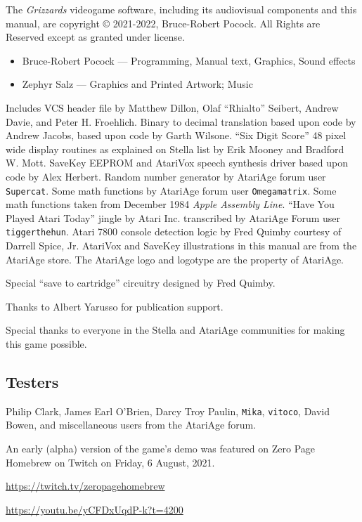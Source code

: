 \documentclass[10pt,twocolumn,openany,article]{memoir}
\begin{document}
{\small

  The \textit{Grizzards}  videogame software, including  its audiovisual
  components  and this  manual,  are  copyright \copyright{}  2021-2022,
  Bruce-Robert  Pocock.  All  Rights  are  Reserved  except  as  granted
  under license.

\begin{itemize}
\item Bruce-Robert Pocock --- Programming, Manual text, Graphics,
  Sound effects
\item Zephyr Salz --- Graphics and Printed Artwork; Music
\end{itemize}

\bigskip

Includes VCS  header file by  Matthew Dillon, Olaf  ``Rhialto'' Seibert,
Andrew  Davie, and  Peter H.  Froehlich. Binary  to decimal  translation
based upon  code by  Andrew Jacobs,  based upon  code by  Garth Wilsone.
``Six  Digit Score''  48 pixel  wide  display routines  as explained  on
Stella list  by Erik  Mooney and  Bradford W.  Mott. SaveKey  EEPROM and
AtariVox  speech  synthesis driver  based  upon  code by  Alex  Herbert.
Random  number  generator  by  AtariAge  forum  user  \texttt{Supercat}.
Some  math  functions  by AtariAge  forum  user  \texttt{Omega\-matrix}.
Some  math functions  taken  from December  1984 \textit{Apple  Assembly
  Line}.  ``Have  You   Played  Atari  Today''  jingle   by  Atari  Inc.
transcribed by AtariAge Forum user \texttt{tigger\-the\-hun}. Atari 7800
console detection  logic by Fred  Quimby courtesy of Darrell  Spice, Jr.
AtariVox and SaveKey illustrations in  this manual are from the AtariAge
store.  \ifdefined\DEMO\else  The AtariAge  logo  and  logotype are  the
property of AtariAge. \fi

Special ``save to cartridge'' circuitry designed by Fred Quimby.

Thanks to Albert Yarusso for publication support.

Special thanks  to everyone in  the Stella and AtariAge  communities for
making this game possible.

\subsection{Testers}

Philip Clark,
James Earl O'Brien,
Darcy Troy Paulin,
\texttt{Mika},
\texttt{vitoco},
David Bowen,
and miscellaneous users from the AtariAge forum.

An early  (alpha) version of the  game's demo was featured  on Zero Page
Homebrew on Twitch on Friday, 6 August, 2021.

\href{https://twitch.tv/zeropagehomebrew}{https://twitch.tv/\-zero\-page\-homebrew}

\href{https://youtu.be/yCFDxUqdP-k?t=4200}{https://youtu.be/\-yCFDxUqdP-k?t=4200}

}

\vfill

\clearpage
{}

\end{document}
